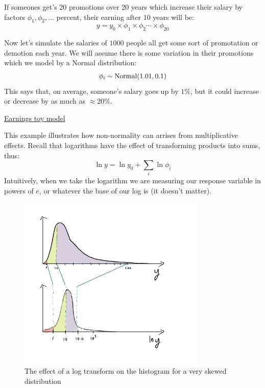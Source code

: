 If someones get's 20 promotions over 20 years which increase their salary by factors $\phi_1,\phi_2,\dots$ percent, their earning after $10$ years will be:
\begin{equation}
y = y_0\times \phi_1 \times \phi_2 \cdots \times \phi_{20}
\end{equation}


Now let's simulate the salaries of $1000$ people all get some sort of promotation or demotion each year. We will assume there is some variation in their promotions which we model by a Normal distribution:
\begin{equation}
\phi_i \sim {\rm Normal}(1.01,0.1)
\end{equation}
This says that, on average, someone's salary goes up by $1\%$, but it could increase or decrease by as much as $\approx 20\%$.

\begin{example}
\href{https://colab.research.google.com/drive/1bBeb3k5xEjGInFtjhB7X8B0LXqkGI0Tn#scrollTo=YGx6p6IPsIqA&line=1&uniqifier=1}{Earnings toy model}
\end{example}

This example illustrates how non-normality can arrises from multiplicative effects. Recall that logarithms have the effect of transforming products into sums, thus: 
\begin{equation}
\ln y = \ln y_0 + \sum_i \ln \phi_i 
\end{equation}
Intuitively, when we take the logarithm we are measuring our response variable in powers of $e$, or whatever the base of our log is (it doesn't matter). 



\begin{figure}[h]
    \centering
    \includegraphics[width=0.8\textwidth]{log_hist}
    \caption{The effect of a log transform on the histogram for a very skewed distribution }
    \label{fig:log_hist}
\end{figure}

